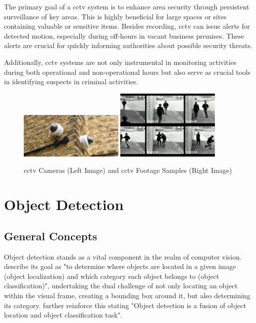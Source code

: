 The primary goal of a \ac{cctv} system is to enhance area security through persistent surveillance of key areas. This is highly beneficial for large spaces or sites containing valuable or sensitive items. Besides recording, \ac{cctv} can issue alerts for detected motion, especially during off-hours in vacant business premises. These alerts are crucial for quickly informing authorities about possible security threats.

Additionally, \ac{cctv} systems are not only instrumental in monitoring activities during both operational and non-operational hours but also serve as crucial tools in identifying suspects in criminal activities.

\begin{figure}[h]
    \centering
    \includegraphics[width=0.45\textwidth]{figs/cctv.jpg}
    \hfill
    \includegraphics[width=0.45\textwidth]{figs/cctv-footage.png}
    \caption{\ac{cctv} Cameras (Left Image) and \ac{cctv} Footage Samples (Right Image)}
    \label{fig:cctv-and-footage}
\end{figure}

\section{Object Detection}
\subsection{General Concepts}
Object detection stands as a vital component in the realm of computer vision. \citet{rfc2} describe its goal as "to determine where objects are located in a given image (object localization) and which category each object belongs to (object classification)", undertaking the dual challenge of not only locating an object within the visual frame, creating a bounding box around it, but also determining its category. \citet{rfc9} further reinforce this stating "Object detection is a fusion of object location and object classification task".

